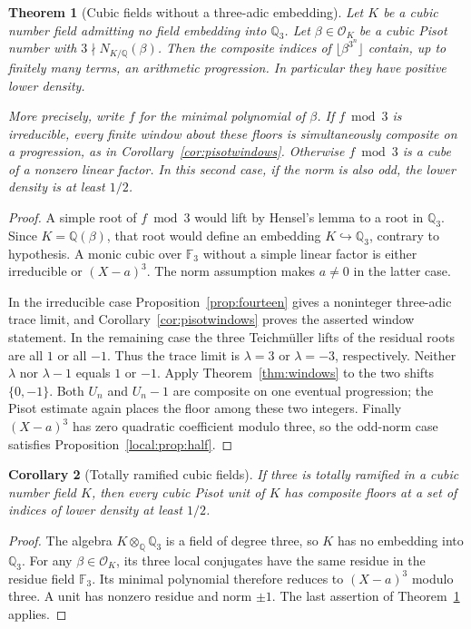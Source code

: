 \documentclass[11pt,a4paper]{article}
\newtheorem{theorem}{Theorem}[section]
\newtheorem{corollary}[theorem]{Corollary}
\theoremstyle{remark}\newtheorem{remark}[theorem]{Remark}
\begin{document}
\begin{theorem}[Cubic fields without a three-adic embedding]
\label{local:thm:noembedding}
Let $K$ be a cubic number field admitting no field embedding into
$\mathbb Q_3$. Let $\beta\in\mathcal O_K$ be a cubic Pisot number
with $3\nmid N_{K/\mathbb Q}(\beta)$. Then the composite indices of
$\lfloor\beta^{3^n}\rfloor$ contain, up to finitely many terms,
an arithmetic progression. In particular they have positive lower
density.

More precisely, write $f$ for the minimal polynomial of $\beta$.
If $f\bmod3$ is irreducible, every finite window about these floors
is simultaneously composite on a progression, as in
Corollary~\ref{cor:pisotwindows}. Otherwise $f\bmod3$ is a cube
of a nonzero linear factor. In this second case, if the norm is
also odd, the lower density is at least $1/2$.
\end{theorem}
\begin{proof}
A simple root of $f\bmod3$ would lift by Hensel's lemma to a root
in $\mathbb Q_3$. Since $K=\mathbb Q(\beta)$, that root would define
an embedding $K\hookrightarrow\mathbb Q_3$, contrary to hypothesis.
A monic cubic over $\mathbb F_3$ without a simple linear factor
is either irreducible or $(X-a)^3$. The norm assumption makes
$a\ne0$ in the latter case.

In the irreducible case Proposition~\ref{prop:fourteen} gives a
noninteger three-adic trace limit, and
Corollary~\ref{cor:pisotwindows} proves the asserted window statement.
In the remaining case the three Teichm\"uller lifts of the residual
roots are all $1$ or all $-1$. Thus the trace limit is $\lambda=3$
or $\lambda=-3$, respectively. Neither $\lambda$ nor $\lambda-1$
equals $1$ or $-1$. Apply Theorem~\ref{thm:windows} to the two
shifts $\{0,-1\}$. Both $U_n$ and $U_n-1$ are composite on one
eventual progression; the Pisot estimate again places the floor
among these two integers. Finally $(X-a)^3$ has zero quadratic
coefficient modulo three, so the odd-norm case satisfies
Proposition~\ref{local:prop:half}.
\end{proof}

\begin{corollary}[Totally ramified cubic fields]
\label{local:cor:ramified}
If three is totally ramified in a cubic number field $K$, then
every cubic Pisot unit of $K$ has composite floors at a set of
indices of lower density at least $1/2$.
\end{corollary}
\begin{proof}
The algebra $K\otimes_{\mathbb Q}\mathbb Q_3$ is a field of
degree three, so $K$ has no embedding into $\mathbb Q_3$.
For any $\beta\in\mathcal O_K$, its three local conjugates have
the same residue in the residue field $\mathbb F_3$. Its minimal
polynomial therefore reduces to $(X-a)^3$ modulo three. A unit
has nonzero residue and norm $\pm1$. The last assertion of
Theorem~\ref{local:thm:noembedding} applies.
\end{proof}
\end{document}
